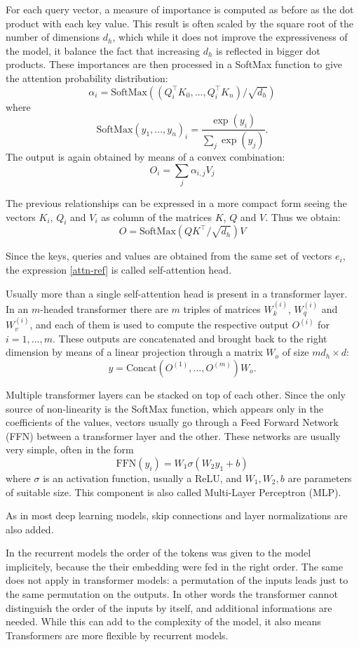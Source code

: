 \documentclass[]{marticle}
\begin{document}
For each query vector, a measure of importance is computed as before as the dot product with each
key value. This result is often scaled by the square root of the number of dimensions $d_h$, which
while it does not improve the expressiveness of the model, it balance the fact that increasing $d_h$
is reflected in bigger dot products. These importances are then processed in a SoftMax function to
give the attention probability distribution:
$$ \alpha_i = \text{SoftMax}((Q_i^\top K_0, \dots, Q_i^\top K_n) / \sqrt{d_h}) $$
where 
$$ \text{SoftMax}(y_1,...,y_n)_i = \frac{\exp(y_i)}{\sum_j \exp (y_j)}. $$
The output is again obtained by means of a convex combination:
$$ O_i = \sum_j \alpha_{i,j} V_j $$

The previous relationships can be expressed in a more compact form seeing the vectors $K_i$, $Q_i$
and $V_i$ as column of the matrices $K$, $Q$ and $V$. Thus we obtain:
\begin{equation}\label{attn-ref}
O = \text{SoftMax} (Q K^\top/\sqrt{d_h})V
\end{equation}

Since the keys, queries and values are obtained from the same set of vectors $e_i$, the expression
\ref{attn-ref} is called self-attention head.

Usually more than a single self-attention head is present in a transformer layer. In an
$m$-headed transformer there are $m$ triples of matrices $W_k^{(i)}$, $W_q^{(i)}$ and $W_v^{(i)}$,
and each of them is used to compute the respective output $O^{(i)}$ for $i=1,..., m$. These outputs
are concatenated and brought back to the right dimension by means of a linear projection through a
matrix $W_o$ of size $m d_h\times d$:
$$ y = \text{Concat}(O^{(1)},..., O^{(m)}) W_o. $$

Multiple transformer layers can be stacked on top of each other. Since the only source of
non-linearity is the SoftMax function, which appears only in the coefficients of the values, vectors
usually go through a Feed Forward Network (FFN) between a transformer layer and the other. These
networks are usually very simple, often in the form
$$ \text{FFN}(y_i) = W_1 \sigma(W_2 y_1 + b) $$
where $\sigma$ is an activation function, usually a ReLU, and $W_1, W_2, b$ are parameters of
suitable size. This component is also called Multi-Layer Perceptron (MLP).

As in most deep learning models, skip connections and layer normalizations are also added.

In the recurrent models the order of the tokens was given to the model implicitely, because the
their embedding were fed in the right order. The same does not apply in transformer models: a
permutation of the inputs leads just to the same permutation on the outputs. In other words the
transformer cannot distinguish the order of the inputs by itself, and additional informations are
needed. While this can add to the complexity of the model, it also means Transformers are more
flexible by recurrent models.
\end{document}
